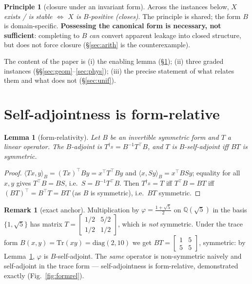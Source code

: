 \documentclass[11pt]{article}
\newtheorem{lemma}[theorem]{Lemma}
\theoremstyle{definition}
\newtheorem{principle}[theorem]{Principle}
\newtheorem{remark}[theorem]{Remark}
\newcommand{\Q}{\mathbb{Q}}
\newcommand{\Tr}{\mathrm{Tr}}
\begin{document}
\begin{principle}[closure under an invariant form]\label{prin:main}
Across the instances below, \emph{$X$ exists / is stable $\iff$ $X$ is $B$-positive
(closes)}. The principle is shared; the form $B$ is domain-specific. \textbf{Possessing the
canonical form is necessary, not sufficient}: completing to $B$ \emph{can} convert apparent
leakage into closed structure, but does not force closure (\S\ref{sec:arith} is the
counterexample).
\end{principle}

The content of the paper is (i) the enabling lemma (\S\ref{sec:formrel}); (ii) three graded
instances (\S\S\ref{sec:geom}--\ref{sec:phys}); (iii) the precise statement of what relates
them and what does not (\S\ref{sec:unif}).

\section{Self-adjointness is form-relative}\label{sec:formrel}
\begin{lemma}[form-relativity]\label{lem:formrel}
Let $B$ be an invertible symmetric form and $T$ a linear operator. The $B$-adjoint is
$T^{\dagger_B}=B^{-1}T^{\top}B$, and $T$ is $B$-self-adjoint iff $BT$ is symmetric.
\end{lemma}
\begin{proof}
$\langle Tx,y\rangle_B=(Tx)^\top By=x^\top T^\top By$ and $\langle x,Sy\rangle_B=x^\top BSy$;
equality for all $x,y$ gives $T^\top B=BS$, i.e.\ $S=B^{-1}T^\top B$. Then $T^{\dagger_B}=T$
iff $T^\top B=BT$ iff $(BT)^\top=B^\top T=BT$ (as $B$ is symmetric), i.e.\ $BT$ symmetric.
\end{proof}

\begin{remark}[exact anchor]\label{rem:phi}
Multiplication by $\varphi=\tfrac{1+\sqrt5}{2}$ on $\Q(\sqrt5)$ in the basis $\{1,\sqrt5\}$
has matrix $T=\left[\begin{smallmatrix}1/2&5/2\\1/2&1/2\end{smallmatrix}\right]$, which is
\emph{not} symmetric. Under the trace form $B(x,y)=\Tr(xy)=\mathrm{diag}(2,10)$ we get
$BT=\left[\begin{smallmatrix}1&5\\5&5\end{smallmatrix}\right]$, symmetric: by
Lemma~\ref{lem:formrel}, $\varphi$ is $B$-self-adjoint. The \emph{same} operator is
non-symmetric naively and self-adjoint in the trace form --- self-adjointness is
form-relative, demonstrated exactly (Fig.~\ref{fig:formrel}).
\end{remark}
\end{document}
